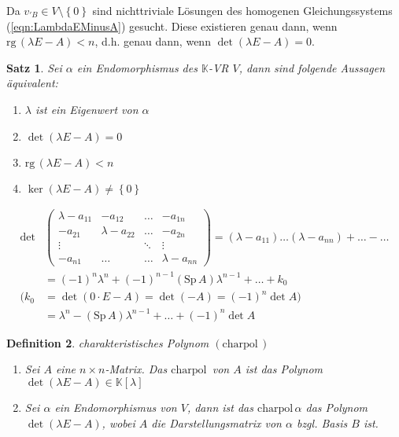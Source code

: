 \documentclass[%
a4paper,
11pt,		%
]
{scrartcl}
\newcommand{\K}{\mathbb{K}}
\newcommand{\rg}{\text{rg}\,}
\newcommand{\Sp}{\text{Sp}\,}
\newcommand{\charpol}{\text{charpol}\,}
\theoremstyle{plain}
\newtheorem{mydef}{Definition}[section]
\theoremstyle{plain}
\newtheorem{mysatz}[mydef]{Satz}
\theoremstyle{plain}
\theoremstyle{plain}
\theoremstyle{plain}
\begin{document}
Da $v_{'B} \in V\setminus\left\{0\right\}$ sind nichttriviale Lösungen des homogenen Gleichungssystems (\ref{eqn:LambdaEMinusA}) gesucht. Diese existieren genau dann, wenn $\rg(\lambda E - A) < n$, d.h. genau dann, wenn $\det(\lambda E-A)=0$.

\begin{mysatz}
    Sei $\alpha$ ein Endomorphismus des $\K$-VR $V$, dann sind folgende Aussagen äquivalent:
    \begin{enumerate}
        \item $\lambda$ ist ein Eigenwert von $\alpha$
        \item $\det(\lambda E - A) = 0$
        \item $\rg(\lambda E - A) < n$
        \item $\ker(\lambda E - A) \neq \left\{ 0 \right\}$
    \end{enumerate}
    \begin{align*}
        \det &
        \begin{pmatrix}
            \lambda - a_{11} & -a_{12} & \dots & -a_{1n}\\
            -a_{21} & \lambda - a_{22} & \dots & -a_{2n}\\
            \vdots & & \ddots & \vdots\\
            -a_{n1} & \dots & \dots & \lambda - a_{nn}
        \end{pmatrix}
        =
        (\lambda - a_{11}) \ldots (\lambda - a_{nn}) + \ldots - \ldots\\
        & = (-1)^n \lambda^n + (-1)^{n-1} (\Sp A)\lambda^{n-1} + \ldots + k_0\\
        \Big( k_0 & = \det(0 \cdot E-A) = \det(-A) = (-1)^n \det A \Big)\\
        & = \lambda^n - (\Sp A)\lambda^{n-1} + \ldots + (-1)^n \det A
    \end{align*}
\end{mysatz}

\begin{mydef}
    \textit{charakteristisches Polynom} $(\charpol)$
    \begin{enumerate}
        \item Sei $A$ eine $n \times n$-Matrix. Das $\charpol$ von $A$ ist das Polynom $\det(\lambda E-A) \in \K\left[ \lambda \right]$
        \item Sei $\alpha$ ein Endomorphismus von $V$, dann ist das $\charpol \alpha$ das Polynom $\det(\lambda E-A)$, wobei $A$ die Darstellungsmatrix von $\alpha$ bzgl. Basis $B$ ist.
    \end{enumerate}
\end{mydef}
\end{document}
